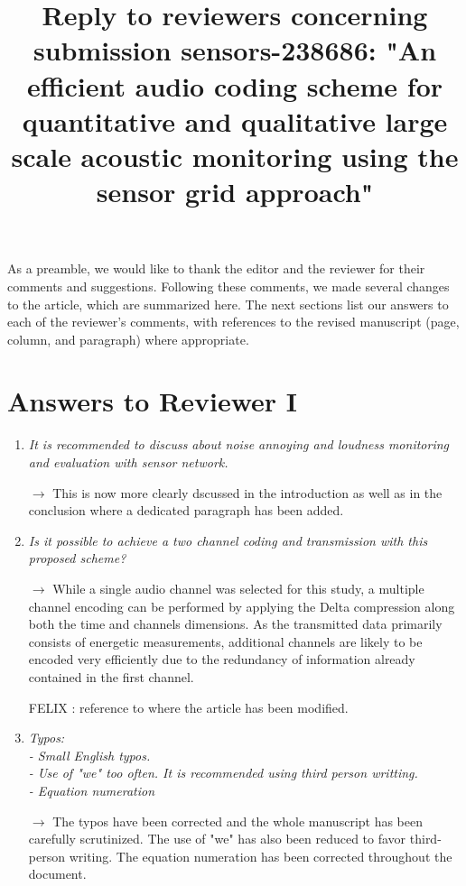 \documentclass[10pt]{article}
\title{Reply to reviewers concerning submission sensors-238686: "An efficient audio coding scheme  for quantitative and qualitative large scale acoustic monitoring using the sensor grid approach"}
\begin{document}
\maketitle

As a preamble, we would like to thank the editor and the reviewer for their comments and suggestions. Following these comments, we made several changes to the article, which are summarized here. The next sections list our answers to each of the reviewer’s comments, with references to the revised manuscript (page, column, and paragraph) where appropriate.


\section{Answers to Reviewer I}

\begin{enumerate}

\item \emph{It is recommended to discuss about noise annoying and loudness monitoring and evaluation with sensor network.}

$\rightarrow$ This is now more clearly dscussed in the introduction as well as in the conclusion where a dedicated paragraph has been added.

\item \emph{Is it possible to achieve a two channel coding and transmission with this proposed scheme?}

$\rightarrow$ While a single audio channel was selected for this study, a multiple channel encoding can be performed by applying the Delta compression along both the time and channels dimensions. As the transmitted data primarily consists of energetic measurements, additional channels are likely to be encoded very efficiently due to the redundancy of information already contained in the first channel.

FELIX : reference to where the article has been modified.

\item \emph{Typos:\\
- Small English typos.\\
- Use of "we" too often. It is recommended using third person writting.\\
- Equation numeration}

$\rightarrow$ The typos have been corrected and the whole manuscript has been carefully scrutinized. The use of "we" has also been reduced to favor third-person writing. The equation numeration has been corrected throughout the document.

\end{enumerate}
\end{document}
